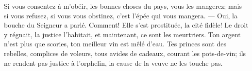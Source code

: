 Si vous consentez à m’obéir, les bonnes choses du pays, vous les mangerez;
	mais si vous refusez, si vous vous obstinez, c’est l’épée qui vous mangera.
	--- Oui, la bouche du Seigneur a parlé.
Comment! Elle s’est prostituée, la cité fidèle!
	Le droit y régnait, la justice l’habitait, et maintenant, ce sont les meurtriers.
Ton argent n’est plus que scories, ton meilleur vin est mêlé d’eau.
Tes princes sont des rebelles, complices de voleurs,
	tous avides de cadeaux, courant les pots-de-vin;
	ils ne rendent pas justice à l’orphelin, la cause de la veuve ne les touche pas.

